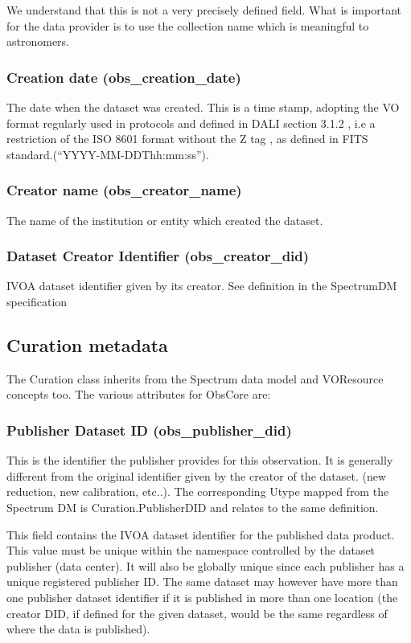 \documentclass[11pt,a4paper]{ivoa}
\begin{document}
We understand that this is not a very precisely defined field. What is important for the data provider is to use the
collection name which is meaningful to astronomers.

\subsubsection{Creation date (obs\_creation\_date)}
The date when the dataset was created. This is a time stamp, adopting the VO format regularly used in protocols and
defined in DALI \citep{2013ivoa.spec.1129D} section 3.1.2 , i.e a restriction of the ISO 8601 format without the Z tag ,
as defined in FITS standard.(``YYYY-MM-DDThh:mm:ss'').

\subsubsection{Creator name (obs\_creator\_name)}
The name of the institution or entity which created the dataset.

\subsubsection{Dataset  Creator Identifier (obs\_creator\_did)}
IVOA dataset identifier given by its creator. See definition in the SpectrumDM specification \citep{2007ivoa.spec.1029M} 

\subsection{Curation metadata}
The Curation class inherits from the Spectrum data model and VOResource concepts too.  The various attributes for
ObsCore are:

\subsubsection{Publisher Dataset ID (obs\_publisher\_did)}
This is the identifier the publisher provides for this observation. It is generally different from the original
identifier given by the creator of the dataset. (new reduction, new calibration, etc..).  The corresponding Utype
mapped from the Spectrum DM is Curation.PublisherDID and relates to the same definition.

This field contains the IVOA dataset identifier \citep{2007ivoa.spec.0314P} for the published data product. This value
must be unique within the namespace controlled by the dataset publisher (data center).  It will also be globally unique
since each publisher has a unique registered publisher ID.  The same dataset may however have more than one publisher
dataset identifier if it is published in more than one location (the creator DID, if defined for the given dataset,
would be the same regardless of where the data is published).
\end{document}

